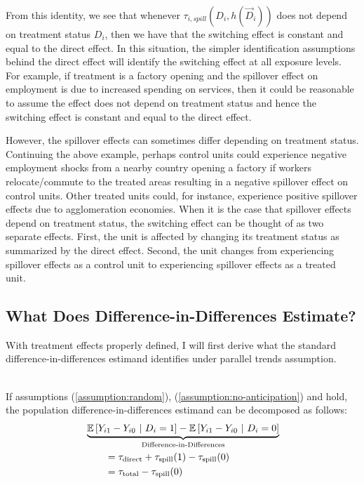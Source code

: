 \documentclass[11pt]{article}
\begin{document}
From this identity, we see that whenever $\tau_{i,spill}(D_i, h(\vec{D}_i))$ does not depend on treatment status $D_i$, then we have that the switching effect is constant and equal to the direct effect. In this situation, the simpler identification assumptions behind the direct effect will identify the switching effect at all exposure levels. For example, if treatment is a factory opening and the spillover effect on employment is due to increased spending on services, then it could be reasonable to assume the effect does not depend on treatment status and hence the switching effect is constant and equal to the direct effect. 

However, the spillover effects can sometimes differ depending on treatment status. Continuing the above example, perhaps control units could experience negative employment shocks from a nearby country opening a factory if workers relocate/commute to the treated areas resulting in a negative spillover effect on control units. Other treated units could, for instance, experience positive spillover effects due to agglomeration economies. When it is the case that spillover effects depend on treatment status, the switching effect can be thought of as two separate effects. First, the unit is affected by changing its treatment status as summarized by the direct effect. Second, the unit changes from experiencing spillover effects as a control unit to experiencing spillover effects as a treated unit.

\subsection{What Does Difference-in-Differences Estimate?}

With treatment effects properly defined, I will first derive what the standard difference-in-differences estimand identifies under parallel trends assumption. 

\begin{proposition}\label{thm:bias}\ \\    
    If assumptions (\ref{assumption:random}), (\ref{assumption:no-anticipation}) and  hold, the population difference-in-differences estimand can be decomposed as follows:
    \begin{align}
        &\underbrace{\mathbb{E}\left[Y_{i1} - Y_{i0} \ \vert \ D_i = 1 \right] - \mathbb{E}\left[Y_{i1} - Y_{i0} \ \vert \ D_i = 0 \right]}_{\text{Difference-in-Differences}} \label{eq:did}\\ 
        &\quad\quad= \tau_{\text{direct}} + \tau_{\text{spill}}(1) - \tau_{\text{spill}}(0) \\ 
        &\quad\quad= \tau_{\text{total}} - \tau_{\text{spill}}(0)
    \end{align}
\end{proposition}
\end{document}

